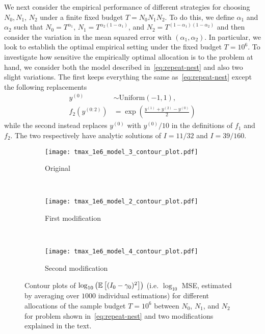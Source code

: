 We next consider the empirical performance of different strategies for choosing $N_0, N_1$, $N_2$ under a 
finite fixed budget $T=N_0N_1N_2$.
To do this, we define $\alpha_1$ and $\alpha_2$ such that $N_0 = T^{\alpha_1}$, 
$N_1 = T^{\alpha_2(1-\alpha_1)}$, and $N_2 = T^{(1-\alpha_1)(1-\alpha_2)}$ and then consider the variation in the
mean squared error with $(\alpha_1,\alpha_2)$.  In particular, we look to establish the optimal empirical
setting under the fixed budget $T=10^6$.  To investigate how sensitive the empirically optimal 
allocation is to the problem at hand, we consider both the model described in~\eqref{eq:repeat-nest} and 
also two slight variations.  The first keeps everything the same as~\eqref{eq:repeat-nest} except the following replacements
\begin{subequations}
	\label{eq:repeat-nest2}
	\begin{align}
		y^{(0)} &\sim \mathrm{Uniform}(-1,1), \\
		f_2 \left(y^{(0:2)}\right)&=\exp\left(\frac{y^{(1)}+y^{(2)}-y^{(0)}}{2}\right)
	\end{align}
\end{subequations}
while the second instead replaces $y^{(0)}$ with $y^{(0)}/10$ in the definitions of $f_1$ and $f_2$.  The two
respectively have analytic solutions of $I=11/32$ and $I=39/160$.


\begin{figure}[t]
	\centering
	\begin{subfigure}[b]{0.32\textwidth}
		\centering
		\texttt{[image: tmax\_1e6\_model\_3\_contour\_plot.pdf]}
		\caption{Original}
	\end{subfigure}
	~\hspace{4pt}
	\begin{subfigure}[b]{0.32\textwidth}
		\centering
		\texttt{[image: tmax\_1e6\_model\_2\_contour\_plot.pdf]}
		\caption{First modification}
	\end{subfigure}
	~\hspace{-2pt}
	\begin{subfigure}[b]{0.32\textwidth}
		\centering
		\texttt{[image: tmax\_1e6\_model\_4\_contour\_plot.pdf]}
		\caption{Second modification}
	\end{subfigure}
	\caption{Contour plots of $\log_{10} \left(\mathbb{E} \left[(I_0-\gamma_0)^2\right]\right)$ (i.e. $\log_{10}$ MSE, estimated
		by averaging over $1000$ individual estimations)
		for different allocations of the sample budget $T=10^6$ between $N_0$, $N_1$,
		and $N_2$ for problem shown in~\eqref{eq:repeat-nest} and two modifications explained in
		the text.
		\label{fig:multi-tau}}
\end{figure}	


